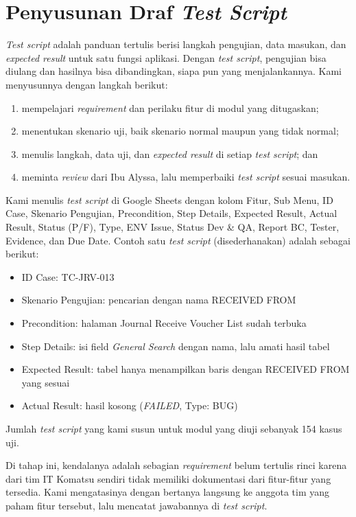 \section{Penyusunan Draf \textit{Test Script}}
\textit{Test script} adalah panduan tertulis berisi langkah pengujian, data masukan, dan \textit{expected result} untuk satu fungsi aplikasi. Dengan \textit{test script}, pengujian bisa diulang dan hasilnya bisa dibandingkan, siapa pun yang menjalankannya. Kami menyusunnya dengan langkah berikut:
\begin{enumerate}[label=\arabic*)]
\item mempelajari \textit{requirement} dan perilaku fitur di modul yang ditugaskan;
\item menentukan skenario uji, baik skenario normal maupun yang tidak normal;
\item menulis langkah, data uji, dan \textit{expected result} di setiap \textit{test script}; dan
\item meminta \textit{review} dari Ibu Alyssa, lalu memperbaiki \textit{test script} sesuai masukan.
\end{enumerate}

Kami menulis \textit{test script} di Google Sheets dengan kolom Fitur, Sub Menu, ID Case, Skenario Pengujian, Precondition, Step Details, Expected Result, Actual Result, Status (P/F), Type, ENV Issue, Status Dev \& QA, Report BC, Tester, Evidence, dan Due Date. Contoh satu \textit{test script} (disederhanakan) adalah sebagai berikut:
\begin{itemize}
\item ID Case: TC-JRV-013
\item Skenario Pengujian: pencarian dengan nama RECEIVED FROM
\item Precondition: halaman Journal Receive Voucher List sudah terbuka
\item Step Details: isi field \textit{General Search} dengan nama, lalu amati hasil tabel
\item Expected Result: tabel hanya menampilkan baris dengan RECEIVED FROM yang sesuai
\item Actual Result: hasil kosong (\textit{FAILED}, Type: BUG)
\end{itemize}
Jumlah \textit{test script} yang kami susun untuk modul yang diuji sebanyak 154 kasus uji.

Di tahap ini, kendalanya adalah sebagian \textit{requirement} belum tertulis rinci karena dari tim IT Komatsu sendiri tidak memiliki dokumentasi dari fitur-fitur yang tersedia. Kami mengatasinya dengan bertanya langsung ke anggota tim yang paham fitur tersebut, lalu mencatat jawabannya di \textit{test script}. 

